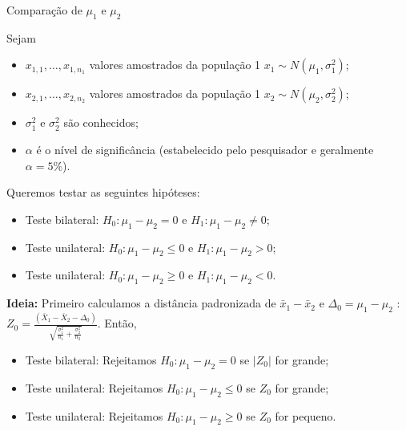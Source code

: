 \documentclass[9pt]{beamer}
\begin{document}
\begin{frame}{Comparação de $\mu_1$ e $\mu_2$}

Sejam
\begin{itemize}
	\item $x_{1,1}, \dots, x_{1, n_1}$ valores amostrados da população 1 $x_1 \sim N(\mu_1, \sigma_1^2)$;
	\item $x_{2,1}, \dots, x_{2, n_2}$ valores amostrados da população 1 $x_2 \sim N(\mu_2, \sigma_2^2)$;
	\item $\sigma_1^2$ e $\sigma_2^2$ são conhecidos;
	\item $\alpha$ é o nível de significância (estabelecido pelo pesquisador e geralmente $\alpha=5\%$). 
\end{itemize}
\vfill

Queremos testar as seguintes hipóteses:
\begin{itemize}
	\item Teste bilateral: $H_0: \mu_1 - \mu_2 = 0$ e $H_1: \mu_1 - \mu_2 \neq 0$;
	\item Teste unilateral: $H_0: \mu_1 - \mu_2 \leq 0$ e $H_1: \mu_1 - \mu_2 > 0$;
	\item Teste unilateral: $H_0: \mu_1 - \mu_2 \geq 0$ e $H_1: \mu_1 - \mu_2 < 0$.
\end{itemize}
\vfill

\textbf{Ideia:} Primeiro calculamos a distância padronizada de $\bar{x}_1 - \bar{x}_2$ e $\Delta_0=\mu_1 - \mu_2$ : $Z_0 = \frac{(\bar{X}_1 - \bar{X}_2 - \Delta_0)}{\sqrt{ \frac{\sigma_1^2}{n_1} + \frac{\sigma_2^2}{n_2} }}$. Então, 
\begin{itemize}
	\item Teste bilateral: Rejeitamos $H_0: \mu_1 - \mu_2 =0$ se $\lvert Z_0 \rvert$ for grande;
	\item Teste unilateral: Rejeitamos $H_0: \mu_1 - \mu_2 \leq 0$ se $Z_0 $ for grande;
	\item Teste unilateral: Rejeitamos $H_0: \mu_1 - \mu_2 \geq 0$ se $Z_0 $ for pequeno.
\end{itemize}

\end{frame}
\end{document}
